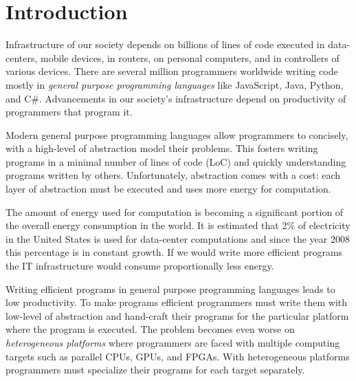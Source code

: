 \chapter{Introduction}
\label{sct:introduction}

Infrastructure of our society depends on billions of lines of code executed in data-centers,
 mobile devices, in routers, on personal computers, and in controllers of various devices. There are
 several million programmers worldwide writing code mostly in \emph{general purpose programming languages}
 like JavaScript, Java, Python, and C\#. Advancements in our society's infrastructure depend on
 productivity of programmers that program it.

Modern general purpose programming languages allow programmers to concisely, with a high-level of
 abstraction model their problems. This fosters writing programs in a minimal
 number of lines of code (LoC) and quickly understanding programs written by others.
 Unfortunately, abstraction comes with a cost: each layer of abstraction must be
 executed and uses more energy for computation.


The amount of energy used for computation is becoming a significant portion of the overall energy consumption in the world.
 It is estimated that 2\%  of electricity in the United States is used for data-center computations and since
 the year 2008 this percentage is in constant growth. If we would write more efficient
 programs the IT infrastructure would consume proportionally less energy.

Writing efficient programs in general purpose programming languages leads to low productivity.
 To make programs efficient programmers must write them with low-level of abstraction and hand-craft their
 programs for the particular platform where the program is executed. The problem
 becomes even worse on \emph{heterogeneous platforms} where programmers are faced
 with multiple computing targets such as parallel CPUs, GPUs, and FPGAs. With heterogeneous
 platforms programmers must specialize their programs for each target separately.

